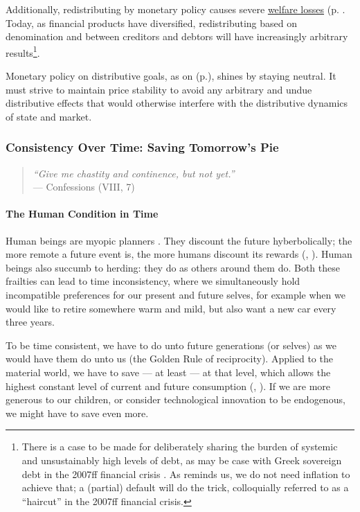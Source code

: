 Additionally, redistributing by monetary policy causes severe \hyperref[sec:pricestability]{welfare losses} (p. \pageref{sec:pricestability}. Today, as financial products have diversified, redistributing based on denomination and between creditors and debtors will have increasingly arbitrary results\footnote{
	There is a case to be made for deliberately sharing the burden of systemic and unsustainably high levels of debt, as may be case with Greek sovereign debt in the 2007ff financial crisis \citep{Coggan2011}. As \citeauthor{Coggan2011} reminds us, we do not need inflation to achieve that; a (partial) default will do the trick, colloquially referred to as a ``haircut'' in the 2007ff financial crisis.}.

Monetary policy on distributive goals, as on  (p.\pageref{sec:production}), shines by staying neutral. It must strive to maintain price stability to avoid any arbitrary and undue distributive effects that would otherwise interfere with the distributive dynamics of state and market.

\subsubsection[Consistency Over Time]{Consistency Over Time: Saving Tomorrow's Pie}\label{sec:time} 

\begin{quote}
\emph{``Give me chastity and continence, but not yet.''\\}
--- \citeauthor{St.AugusteofHippo397} Confessions (VIII, 7)
\end{quote}

\paragraph{The Human Condition in Time}
Human beings are myopic planners \citep{Kahneman47}. They discount the future hyberbolically; the more remote a future event is, the more humans discount its rewards (\citealt{Ainslie1975}, \citealt{Thaler1981}). Human beings also succumb to herding: they do as others around them do. %
Both these frailties can lead to time inconsistency, where we simultaneously hold incompatible preferences for our present and future selves, for example when we would like to retire somewhere warm and mild, but also want a new car every three years.

To be time consistent, we have to do unto future generations (or selves) as we would have them do unto us (the Golden Rule of reciprocity). Applied to the material world, we have to save --- at least --- at that level, which allows the highest constant level of current and future consumption (\citealt{Phelps1966a}, \citealt{Solow1956}). If we are more generous to our children, or consider technological innovation to be endogenous, we might have to save even more.

